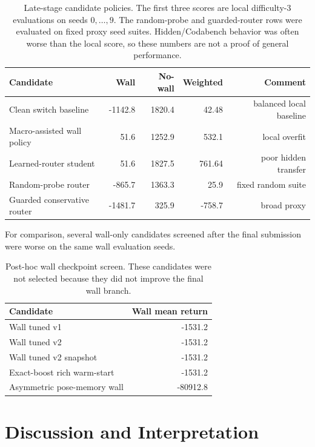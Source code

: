\documentclass[11pt]{article}
\begin{document}
\begin{table}[htbp]
\centering
\small
\begin{tabular}{p{}rrrr}
\toprule
Candidate & Wall & No-wall & Weighted & Comment \\
\midrule
Clean switch baseline & -1142.8 & 1820.4 & 42.48 & balanced local baseline \\
Macro-assisted wall policy & 51.6 & 1252.9 & 532.1 & local overfit \\
Learned-router student & 51.6 & 1827.5 & 761.64 & poor hidden transfer \\
Random-probe router & -865.7 & 1363.3 & 25.9 & fixed random suite \\
Guarded conservative router & -1481.7 & 325.9 & -758.7 & broad proxy \\
\bottomrule
\end{tabular}
\caption{Late-stage candidate policies. The first three scores are local difficulty-3
evaluations on seeds \(0,\ldots,9\). The random-probe and guarded-router rows were
evaluated on fixed proxy seed suites. Hidden/Codabench behavior was often worse than
the local score, so these numbers are not a proof of general performance.}
\label{tab:late_candidates}
\end{table}

For comparison, several wall-only candidates screened after the final submission were
worse on the same wall evaluation seeds.

\begin{table}[htbp]
\centering
\small
\begin{tabular}{lr}
\toprule
Candidate & Wall mean return \\
\midrule
Wall tuned v1 & -1531.2 \\
Wall tuned v2 & -1531.2 \\
Wall tuned v2 snapshot & -1531.2 \\
Exact-boost rich warm-start & -1531.2 \\
Asymmetric pose-memory wall & -80912.8 \\
\bottomrule
\end{tabular}
\caption{Post-hoc wall checkpoint screen. These candidates were not selected because
they did not improve the final wall branch.}
\end{table}

\section{Discussion and Interpretation}
\end{document}
